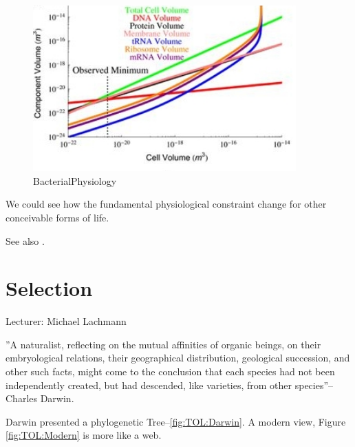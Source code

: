 \documentclass[]{article}
\begin{document}
\begin{figure}[H]
	\caption{BacterialPhysiology}\label{fig:BacterialPhysiology}
	\includegraphics[width=0.9\textwidth]{BacterialPhysiology}
\end{figure}

We could see how the fundamental physiological constraint change for other conceivable forms of life.

See also \cite{kempes2011predicting}.

\section{Selection}

Lecturer: Michael Lachmann

''A naturalist, reflecting on the mutual affinities of organic beings, on their embryological relations, their geographical distribution, geological succession, and other such facts, might come to the conclusion that each species had not been independently created, but had descended, like varieties, from other  species''--Charles Darwin\cite{darwin1859origin}.

Darwin\cite{darwin1859origin} presented a phylogenetic Tree--\ref{fig:TOL:Darwin}. A modern view, Figure \ref{fig:TOL:Modern} is more like a web.
\end{document}
